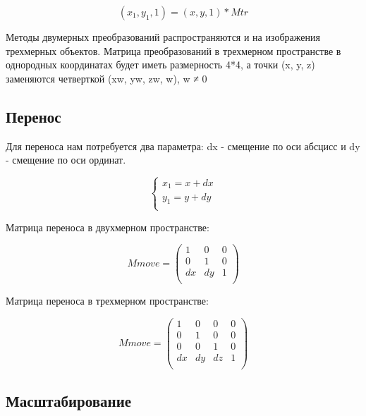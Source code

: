 \begin{equation}
(x_1, y_1, 1) = (x, y, 1) * Mtr
\end{equation}

Методы двумерных преобразований распространяются и на изображения трехмерных объектов. Матрица преобразований  в трехмерном пространстве  в однородных координатах будет иметь размерность 4*4, а точки (x, y, z) заменяются четверткой (xw, yw, zw, w), w ≠ 0

\subsection {Перенос}

Для переноса нам потребуется два параметра: dx - смещение по оси абсцисс и dy - смещение по оси ординат.

\begin{equation}
{\begin{cases} 
	x_1 = x + dx  \\
	y_1 = y + dy  \\
	\end{cases}}
\end{equation}

Матрица переноса в двухмерном пространстве:

\begin{equation}
Mmove = \left(
\begin{array}{cccc}
1 & 0 & 0 \\
0 & 1 & 0 \\
dx & dy & 1 \\
\end{array}
\right)
\end{equation}

Матрица переноса в трехмерном пространстве:

\begin{equation}
Mmove = \left(
\begin{array}{cccc}
1 & 0 & 0 & 0 \\
0 & 1 & 0 & 0 \\
0 & 0 & 1 & 0 \\
dx & dy & dz & 1 \\
\end{array}
\right)
\end{equation}

\subsection {Масштабирование}

